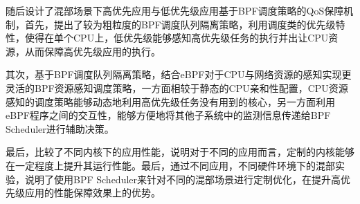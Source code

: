 随后设计了混部场景下高优先应用与低优先级应用基于BPF调度策略的QoS保障机制，首先，提出了较为粗粒度的BPF调度队列隔离策略，利用调度类的优先级特性，使得在单个CPU上，低优先级能够感知高优先级任务的执行并出让CPU资源，从而保障高优先级应用的执行。

其次，基于BPF调度队列隔离策略，结合eBPF对于CPU与网络资源的感知实现更灵活的BPF资源感知调度策略，一方面相较于静态的CPU亲和性配置，CPU资源感知的调度策略能够动态地利用高优先级任务没有用到的核心，另一方面利用eBPF程序之间的交互性，能够方便地将其他子系统中的监测信息传递给BPF Scheduler进行辅助决策。

最后，比较了不同内核下的应用性能，说明对于不同的应用而言，定制的内核能够在一定程度上提升其运行性能。最后，通过不同应用，不同硬件环境下的混部实验，说明了使用BPF Scheduler来针对不同的混部场景进行定制优化，在提升高优先级应用的性能保障效果上的优势。